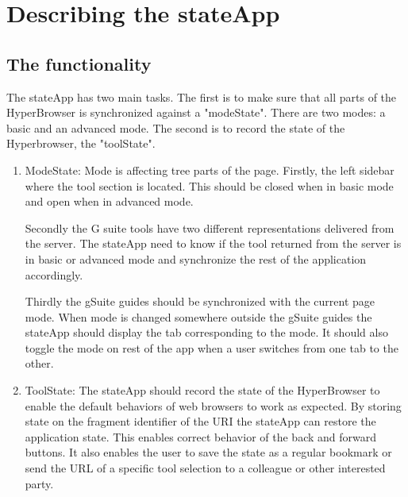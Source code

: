 \documentclass[english]{ifimaster}
\begin{document}

\section{Describing the stateApp}
\subsection{The functionality}
The stateApp has two main tasks. The first is to make sure that all parts of the HyperBrowser is synchronized against a "modeState". There are two modes: a basic and an advanced mode. The second is to record the state of the Hyperbrowser, the "toolState".

\begin{enumerate}
\item{ModeState:}
 Mode is affecting tree parts of the page. Firstly, the left sidebar where the tool section is located. This should be closed when in basic mode and open when in advanced mode. 

Secondly the G suite tools have two different representations delivered from the server. The stateApp need to know if the tool returned from the server is in basic or advanced mode and synchronize the rest of the application accordingly.

Thirdly the gSuite guides should be synchronized with the current page mode. When mode is changed somewhere outside the gSuite guides the stateApp should display the tab corresponding to the mode. It should also toggle the mode on rest of the app when a user switches from one tab to the other. 

\item{ToolState:}
The stateApp should record the state of the HyperBrowser to enable the default behaviors of web browsers to work as expected. By storing state on the fragment identifier of the URI the stateApp can restore the application state. This enables correct behavior of the back and forward buttons. It also enables the user to save the state as a regular bookmark or send the URL of a specific tool selection to a colleague or other interested party.
\end{enumerate}
\end{document}
